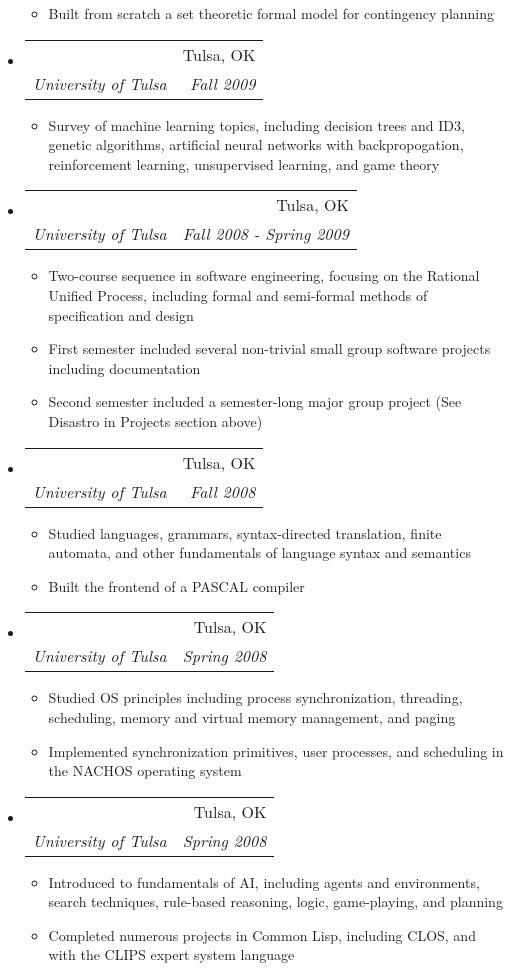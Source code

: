 \documentclass[letterpaper,11pt]{article}
\makeatletter
\newcommand{\resitem}[1]{\item #1 \vspace{-2pt}}
\newcommand{\ressubheading}[4]{
\begin{tabular*}{6.5in}{l@{\extracolsep{\fill}}r}
		\textbf{\parbox{5in}{\raggedright #1 }} & #2 \\
		\textit{#3} & \textit{#4} \\
\end{tabular*}\vspace{-6pt}}
\makeatother
\begin{document}
\begin{itemize}
\begin{itemize}
		\resitem{Built from scratch a set theoretic formal model for contingency planning}
	\end{itemize}
\item
	\ressubheading{Machine Learning}{Tulsa, OK}{University of Tulsa}{Fall 2009}
	\begin{itemize}
		\resitem{Survey of machine learning topics, including decision trees and ID3, genetic algorithms, artificial neural networks with backpropogation, reinforcement learning, unsupervised learning, and game theory}
	\end{itemize}
\item
	\ressubheading{Senior Software Projects}{Tulsa, OK}{University of Tulsa}{Fall 2008 - Spring 2009}
	\begin{itemize}
		\resitem{Two-course sequence in software engineering, focusing on the Rational Unified Process, including formal and semi-formal methods of specification and design}
		\resitem{First semester included several non-trivial small group software projects including documentation}
		\resitem{Second semester included a semester-long major group project (See Disastro in Projects section above)}
	\end{itemize}
\item
	\ressubheading{Compiler Construction}{Tulsa, OK}{University of Tulsa}{Fall 2008}
	\begin{itemize}
		\resitem{Studied languages, grammars, syntax-directed translation, finite automata, and other fundamentals of language syntax and semantics}
		\resitem{Built the frontend of a PASCAL compiler}
	\end{itemize}
\item
	\ressubheading{Operating Systems}{Tulsa, OK}{University of Tulsa}{Spring 2008}
	\begin{itemize}
		\resitem{Studied OS principles including process synchronization, threading, scheduling, memory and virtual memory management, and paging}
		\resitem{Implemented synchronization primitives, user processes, and scheduling in the NACHOS operating system}
	\end{itemize}
\item
	\ressubheading{Artificial Intelligence}{Tulsa, OK}{University of Tulsa}{Spring 2008}
	\begin{itemize}
		\resitem{Introduced to fundamentals of AI, including agents and environments, search techniques, rule-based reasoning, logic, game-playing, and planning}
		\resitem{Completed numerous projects in Common Lisp, including CLOS, and with the CLIPS expert system language}

\end{itemize}
\end{itemize}
\end{document}
